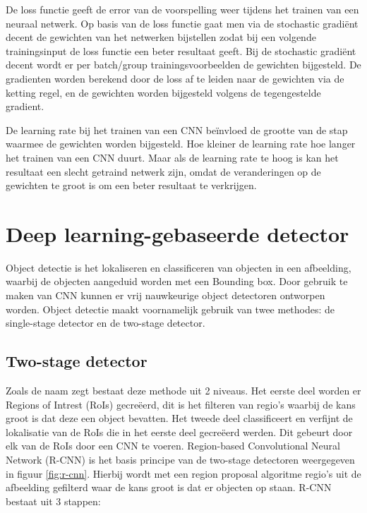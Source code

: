 De loss functie geeft de error van de voorspelling weer tijdens het trainen van een neuraal netwerk. 
Op basis van de loss functie gaat men via de stochastic gradi\"ent decent de gewichten van het netwerken bijstellen zodat bij een volgende trainingsinput de loss functie een beter resultaat geeft. 
Bij de stochastic gradi\"ent decent wordt er per batch/group trainingsvoorbeelden de gewichten bijgesteld. 
De gradienten worden berekend door de loss af te leiden naar de gewichten via de ketting regel, en de gewichten worden bijgesteld volgens de tegengestelde gradient. 

De learning rate bij het trainen van een CNN be\"invloed de grootte van de stap waarmee de gewichten worden bijgesteld.
Hoe kleiner de learning rate hoe langer het trainen van een CNN duurt.
Maar als de learning rate te hoog is kan het resultaat een slecht getraind netwerk zijn, omdat de veranderingen op de gewichten te groot is om een beter resultaat te verkrijgen.


\section{Deep learning-gebaseerde detector}
Object detectie is het lokaliseren en classificeren van objecten in een afbeelding, waarbij de objecten aangeduid worden met een Bounding box. 
Door gebruik te maken van CNN kunnen er vrij nauwkeurige object detectoren ontworpen worden. 
Object detectie maakt voornamelijk gebruik van twee methodes: de single-stage detector en de two-stage detector.

\subsection{Two-stage detector}
Zoals de naam zegt bestaat deze methode uit 2 niveaus. 
Het eerste deel worden er Regions of Intrest (RoIs) gecre\"eerd, dit is het filteren van regio's waarbij de kans groot is dat deze een object bevatten. 
Het tweede deel classificeert en verfijnt de lokalisatie van de RoIs die in het eerste deel gecre\"eerd werden. 
Dit gebeurt door elk van de RoIs door een CNN te voeren. 
Region-based Convolutional Neural Network (R-CNN) \cite{girshick_fast_2015} is het basis principe van de two-stage detectoren weergegeven in figuur \ref{fig:r-cnn}. 
Hierbij wordt met een region proposal algoritme regio's uit de afbeelding gefilterd waar de kans groot is dat er objecten op staan.
R-CNN bestaat uit 3 stappen:
 
